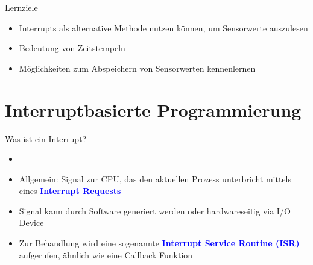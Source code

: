 \begin{frame}{Lernziele}
    \begin{itemize}
       \item Interrupts als alternative Methode nutzen können, um Sensorwerte auszulesen
       \item  Bedeutung von Zeitstempeln
        \item Möglichkeiten zum Abspeichern von Sensorwerten kennenlernen
    \end{itemize}
\end{frame}


\section{Interruptbasierte Programmierung}

\begin{frame}{Was ist ein Interrupt?}
    \begin{itemize}
        \setlength{\itemindent}{1.2in}
        \item [\textbf{Definition Interrupt}]
    \end{itemize}

    \begin{itemize}
        \item Allgemein: Signal zur CPU, das den aktuellen Prozess unterbricht mittels eines  \textcolor{blue}{\textbf{Interrupt Requests}}
        \item Signal kann durch Software generiert werden oder hardwareseitig via I/O Device
        \item Zur Behandlung wird eine sogenannte \textcolor{blue}{\textbf{Interrupt Service Routine (ISR)}} aufgerufen, ähnlich wie eine Callback Funktion
     \end{itemize}
\end{frame}

